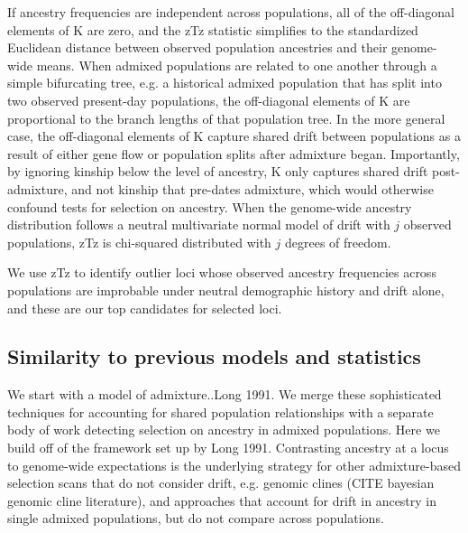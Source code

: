 \documentclass[12pt]{report}
\begin{document}
If ancestry frequencies are independent across populations, all of the off-diagonal elements of K are zero, and the zTz statistic simplifies to the standardized Euclidean distance between observed population ancestries and their genome-wide means. When admixed populations are related to one another through a simple bifurcating tree, e.g. a historical admixed population that has split into two observed present-day populations, the off-diagonal elements of K are proportional to the branch lengths of that population tree. In the more general case, the off-diagonal elements of K capture shared drift between populations as a result of either gene flow or population splits after admixture began. Importantly, by ignoring kinship below the level of ancestry, K only captures shared drift post-admixture, and not kinship that pre-dates admixture, which would otherwise confound tests for selection on ancestry. When the genome-wide ancestry distribution follows a neutral multivariate normal model of drift with $j$ observed populations, zTz is chi-squared distributed with $j$ degrees of freedom. 

We use zTz to identify outlier loci whose observed ancestry frequencies across populations are improbable under neutral demographic history and drift alone, and these are our top candidates for selected loci. 

\subsection{Similarity to previous models and statistics}
We start with a model of admixture..Long 1991.
We merge these sophisticated techniques for accounting for shared population relationships with a separate body of work detecting selection on ancestry in admixed populations. Here we build off of the framework set up by Long 1991.
Contrasting ancestry at a locus to genome-wide expectations is the underlying strategy for other admixture-based selection scans that do not consider drift, e.g. genomic clines (CITE bayesian genomic cline literature), and approaches that account for drift in ancestry in single admixed populations, but do not compare across populations.
\end{document}

